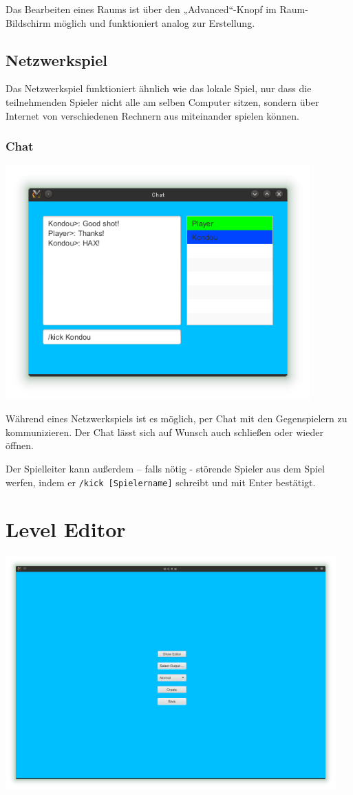 \documentclass{scrreprt}
\begin{document}
Das Bearbeiten eines Raums ist über den „Advanced“-Knopf im Raum-Bildschirm möglich und funktioniert analog zur Erstellung.


\section{Netzwerkspiel}

Das Netzwerkspiel funktioniert ähnlich wie das lokale Spiel, nur dass die teilnehmenden Spieler nicht alle am selben Computer sitzen, sondern über Internet von verschiedenen Rechnern aus miteinander spielen können.

\subsection{Chat}

\includegraphics[height=9cm]{Screenshot12.png}

Während eines Netzwerkspiels ist es möglich, per Chat mit den Gegenspielern zu kommunizieren. Der Chat lässt sich auf Wunsch auch schließen oder wieder öffnen.

Der Spielleiter kann außerdem – falls nötig - störende Spieler aus dem Spiel werfen, indem er \texttt{/kick [Spielername]} schreibt und mit Enter
bestätigt.

\chapter{Level Editor}

\includegraphics[height=9cm]{Screenshot3.png}
\end{document}
